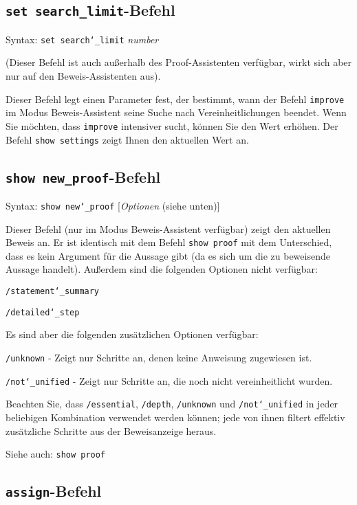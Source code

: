 \subsection{\texttt{set search\_limit}-Befehl} 

Syntax:  \texttt{set search{\char`\_}limit} {\em number}

(Dieser Befehl ist auch außerhalb des Proof-Assistenten verfügbar, wirkt sich aber nur auf den Beweis-Assistenten aus). 

Dieser Befehl legt einen Parameter fest, der bestimmt, wann der Befehl \texttt{improve} im Modus Beweis-Assistent seine Suche nach Vereinheitlichungen beendet.  Wenn Sie möchten, dass \texttt{improve} intensiver sucht, können Sie den Wert erhöhen.  Der Befehl \texttt{show settings} zeigt Ihnen den aktuellen Wert an. 


\subsection{\texttt{show new\_proof}-Befehl}

Syntax:  \texttt{show new{\char`\_}proof} [{\em Optionen} (siehe unten)]

Dieser Befehl (nur im Modus Beweis-Assistent verfügbar) zeigt den aktuellen Beweis an.  Er ist identisch mit dem Befehl \texttt{show proof} mit dem Unterschied, dass es kein Argument für die Aussage gibt (da es sich um die zu beweisende Aussage handelt). Außerdem sind die folgenden Optionen nicht verfügbar: 

    \texttt{/statement{\char`\_}summary}

    \texttt{/detailed{\char`\_}step}

Es sind aber die folgenden zusätzlichen Optionen verfügbar:

    \texttt{/unknown} - Zeigt nur Schritte an, denen keine Anweisung zugewiesen ist.

    \texttt{/not{\char`\_}unified} - Zeigt nur Schritte an, die noch nicht vereinheitlicht wurden.

Beachten Sie, dass \texttt{/essential}, \texttt{/depth}, \texttt{/unknown} und \texttt{/not{\char`\_}unified} in jeder beliebigen Kombination verwendet werden können; jede von ihnen filtert effektiv zusätzliche Schritte aus der Beweisanzeige heraus.

Siehe auch:  \texttt{show proof}


\subsection{\texttt{assign}-Befehl}

